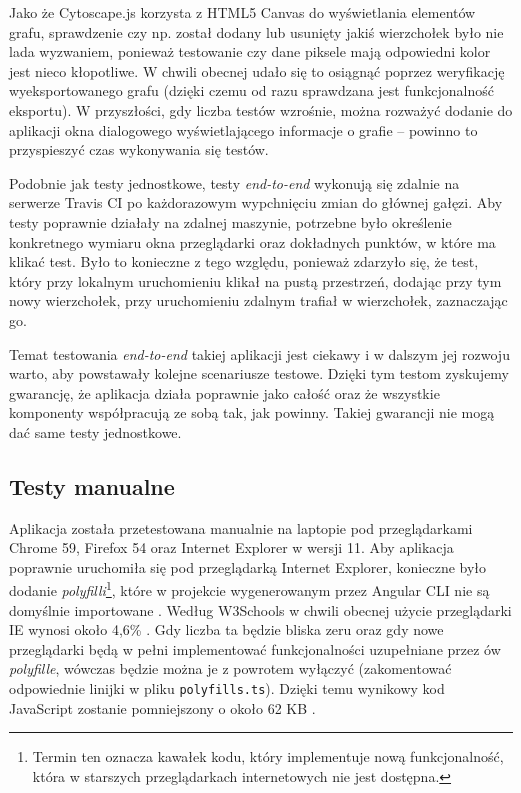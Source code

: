 Jako że Cytoscape.js korzysta z HTML5 Canvas do wyświetlania elementów grafu, sprawdzenie czy np. został dodany lub usunięty jakiś wierzchołek było nie lada wyzwaniem, ponieważ testowanie czy dane piksele mają odpowiedni kolor jest nieco kłopotliwe. W chwili obecnej udało się to osiągnąć poprzez weryfikację wyeksportowanego grafu (dzięki czemu od razu sprawdzana jest funkcjonalność eksportu). W przyszłości, gdy liczba testów wzrośnie, można rozważyć dodanie do aplikacji okna dialogowego wyświetlającego informacje o grafie -- powinno to przyspieszyć czas wykonywania się testów.

Podobnie jak testy jednostkowe, testy \textit{end-to-end} wykonują się zdalnie na serwerze Travis CI po każdorazowym wypchnięciu zmian do głównej gałęzi. Aby testy poprawnie działały na zdalnej maszynie, potrzebne było określenie konkretnego wymiaru okna przeglądarki oraz dokładnych punktów, w które ma klikać test. Było to konieczne z tego względu, ponieważ zdarzyło się, że test, który przy lokalnym uruchomieniu klikał na pustą przestrzeń, dodając przy tym nowy wierzchołek, przy uruchomieniu zdalnym trafiał w wierzchołek, zaznaczając go. 

Temat testowania \textit{end-to-end} takiej aplikacji jest ciekawy i w dalszym jej rozwoju warto, aby powstawały kolejne scenariusze testowe. Dzięki tym testom zyskujemy gwarancję, że aplikacja działa poprawnie jako całość oraz że wszystkie komponenty współpracują ze sobą tak, jak powinny. Takiej gwarancji nie mogą dać same testy jednostkowe. 

\subsection*{Testy manualne}

Aplikacja została przetestowana manualnie na laptopie pod przeglądarkami Chrome 59, Firefox 54 oraz Internet Explorer w wersji 11. Aby aplikacja poprawnie uruchomiła się pod przeglądarką Internet Explorer, konieczne było dodanie \textit{polyfilli}\footnote{Termin ten oznacza kawałek kodu, który implementuje nową funkcjonalność, która w starszych przeglądarkach internetowych nie jest dostępna.}, które w projekcie wygenerowanym przez Angular CLI nie są domyślnie importowane \cite{duveau}. Według W3Schools w chwili obecnej użycie przeglądarki IE wynosi około 4,6\% \cite{w3schools}. Gdy liczba ta będzie bliska zeru oraz gdy nowe przeglądarki będą w pełni implementować funkcjonalności uzupełniane przez ów \textit{polyfille}, wówczas będzie można je z powrotem wyłączyć (zakomentować odpowiednie linijki w pliku \texttt{polyfills.ts}). Dzięki temu wynikowy kod JavaScript zostanie pomniejszony o około 62 KB \cite{angular-browser-support}. 

